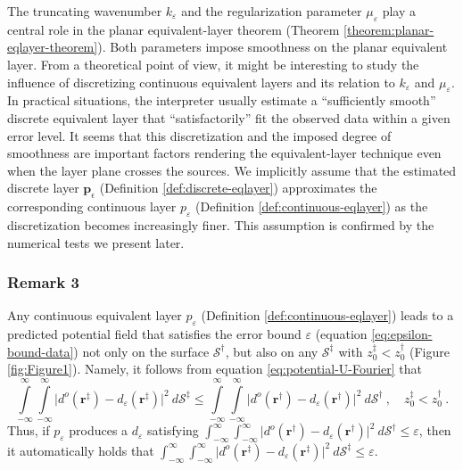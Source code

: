 \documentclass[manuscript,noblind]{geophysics}
\begin{document}
	The truncating wavenumber $k_{\varepsilon}$ and the regularization parameter $\mu_{\varepsilon}$ 
	play a central role in the planar equivalent-layer theorem (Theorem \ref{theorem:planar-eqlayer-theorem}). 
	Both parameters impose smoothness on the planar equivalent layer. 
	From a theoretical point of view, it might be interesting to study the influence of
	discretizing continuous equivalent layers and its relation to $k_{\varepsilon}$ and $\mu_{\varepsilon}$. 
	In practical situations, the interpreter usually estimate a ``sufficiently smooth'' discrete equivalent layer 
	that ``satisfactorily'' fit the observed data within a given error level. 
	It seems that this discretization and the imposed degree of smoothness are important factors rendering 
	the equivalent-layer technique even when the layer plane crosses the sources.
	We implicitly assume that the estimated discrete layer $\mathbf{p}_{\epsilon}$ (Definition \ref{def:discrete-eqlayer}) 
	approximates the corresponding continuous layer $p_{\varepsilon}$ (Definition \ref{def:continuous-eqlayer}) 
	as the discretization becomes increasingly finer. 
	This assumption is confirmed by the numerical tests we present later.
	
	\subsubsection{Remark 3}
	
	Any continuous equivalent layer $p_{\varepsilon}$ (Definition \ref{def:continuous-eqlayer}) leads to a predicted 
	potential field that satisfies
	the error bound $\varepsilon$ (equation \ref{eq:epsilon-bound-data}) not only on the surface $\mathcal{S}^{\dagger}$, but also 
	on any $\mathcal{S}^{\ddagger}$ with $z^{\ddagger}_{0} < z^{\dagger}_{0}$ (Figure \ref{fig:Figure1}). 
	Namely, it follows from equation \ref{eq:potential-U-Fourier} that
	\begin{equation}
		\int\limits_{-\infty}^{\infty} \int\limits_{-\infty}^{\infty}
		\vert d^{o}(\mathbf{r}^{\ddagger}) - d_{\varepsilon}(\mathbf{r}^{\ddagger})
		\vert^{2} \: d\mathcal{S}^{\ddagger} \le
		\int\limits_{-\infty}^{\infty} \int\limits_{-\infty}^{\infty}
		\vert d^{o}(\mathbf{r}^{\dagger}) - d_{\varepsilon}(\mathbf{r}^{\dagger})
		\vert^{2} \: d\mathcal{S}^{\dagger} \: ,
		\quad z^{\ddagger}_{0} < z^{\dagger}_{0} \: .
		\label{eq:error-bound-upper-planes}
	\end{equation}
	Thus, if $p_{\varepsilon}$ produces a $d_{\varepsilon}$ satisfying 
	$\int_{-\infty}^{\infty} \int_{-\infty}^{\infty} \vert d^{o}(\mathbf{r}^{\dagger}) - d_{\varepsilon}(\mathbf{r}^{\dagger}) 
	\vert^{2} \: d\mathcal{S}^{\dagger} \le \varepsilon$, then it automatically holds that 
	$\int_{-\infty}^{\infty} \int_{-\infty}^{\infty} \vert d^{o}(\mathbf{r}^{\ddagger}) - d_{\varepsilon}(\mathbf{r}^{\ddagger}) 
	\vert^{2} \: d\mathcal{S}^{\ddagger} \le \varepsilon$.
	
\end{document}
